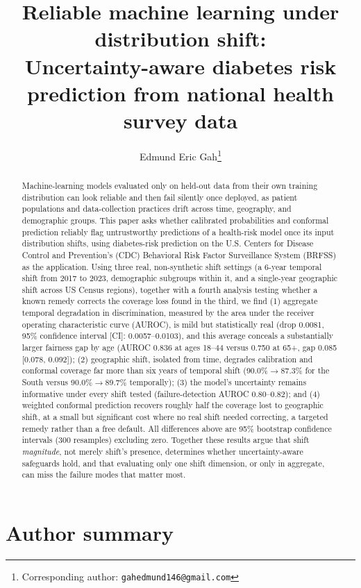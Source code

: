 \documentclass[12pt]{article}
\title{\textbf{Reliable machine learning under distribution shift:\\
Uncertainty-aware diabetes risk prediction from national health survey data}}
\author{Edmund Eric Gah\thanks{Corresponding author: \texttt{gahedmund146@gmail.com}}}
\date{}
\begin{document}
\maketitle

\begin{abstract}
Machine-learning models evaluated only on held-out data from their own training distribution can look reliable and then fail silently once deployed, as patient populations and data-collection practices drift across time, geography, and demographic groups. This paper asks whether calibrated probabilities and conformal prediction reliably flag untrustworthy predictions of a health-risk model once its input distribution shifts, using diabetes-risk prediction on the U.S. Centers for Disease Control and Prevention's (CDC) Behavioral Risk Factor Surveillance System (BRFSS) as the application. Using three real, non-synthetic shift settings (a 6-year temporal shift from 2017 to 2023, demographic subgroups within it, and a single-year geographic shift across US Census regions), together with a fourth analysis testing whether a known remedy corrects the coverage loss found in the third, we find (1) aggregate temporal degradation in discrimination, measured by the area under the receiver operating characteristic curve (AUROC), is mild but statistically real (drop 0.0081, 95\% confidence interval [CI]: 0.0057--0.0103), and this average conceals a substantially larger fairness gap by age (AUROC 0.836 at ages 18--44 versus 0.750 at 65+, gap 0.085 [0.078, 0.092]); (2) geographic shift, isolated from time, degrades calibration and conformal coverage far more than six years of temporal shift (90.0\%$\to$87.3\% for the South versus 90.0\%$\to$89.7\% temporally); (3) the model's uncertainty remains informative under every shift tested (failure-detection AUROC 0.80--0.82); and (4) weighted conformal prediction \citep{tibshirani2019conformal} recovers roughly half the coverage lost to geographic shift, at a small but significant cost where no real shift needed correcting, a targeted remedy rather than a free default. All differences above are 95\% bootstrap confidence intervals (300 resamples) excluding zero. Together these results argue that shift \emph{magnitude}, not merely shift's presence, determines whether uncertainty-aware safeguards hold, and that evaluating only one shift dimension, or only in aggregate, can miss the failure modes that matter most.
\end{abstract}

\section*{Author summary}
\end{document}
